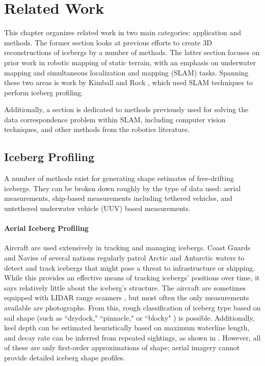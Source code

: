 
\chapter{Related Work}
\label{ch.RelatedWork}

This chapter organizes related work in two main categories: application and methods. The former section looks at previous efforts to create 3D reconstructions of icebergs by a number of methods. The latter section focuses on prior work in robotic mapping of static terrain, with an emphasis on underwater mapping and simultaneous localization and mapping (SLAM) tasks. Spanning these two areas is work by Kimball and Rock \cite{Kimball2011b}, which used SLAM techniques to perform iceberg profiling.

Additionally, a section is dedicated to methods previously used for solving the data correspondence problem within SLAM, including computer vision techniques, and other methods from the robotics literature.

\section{Iceberg Profiling}

A number of methods exist for generating shape estimates of free-drifting icebergs. They can be broken down roughly by the type of data used: aerial measurements, ship-based measurements including tethered vehicles, and untethered underwater vehicle (UUV) based measurements.

\subsubsection{Aerial Iceberg Profiling}

Aircraft are used extensively in tracking and managing icebergs. Coast Guards and Navies of several nations regularly patrol Arctic and Antarctic waters to detect and track icebergs that might pose a threat to infrastructure or shipping. While this provides an effective means of tracking icebergs' positions over time, it says relatively little about the iceberg's structure. The aircraft are sometimes equipped with LIDAR range scanners \cite{Bunkin2012}, but most often the only measurements available are photographs. From this, rough classification of iceberg type based on sail shape (such as ``drydock," ``pinnacle," or ``blocky" ) is possible. Additionally, keel depth can be estimated heuristically based on maximum waterline length, and decay rate can be inferred from repeated sightings, as shown in \cite{Barker2004}. However, all of these are only first-order approximations of shape; aerial imagery cannot provide detailed iceberg shape profiles. 

